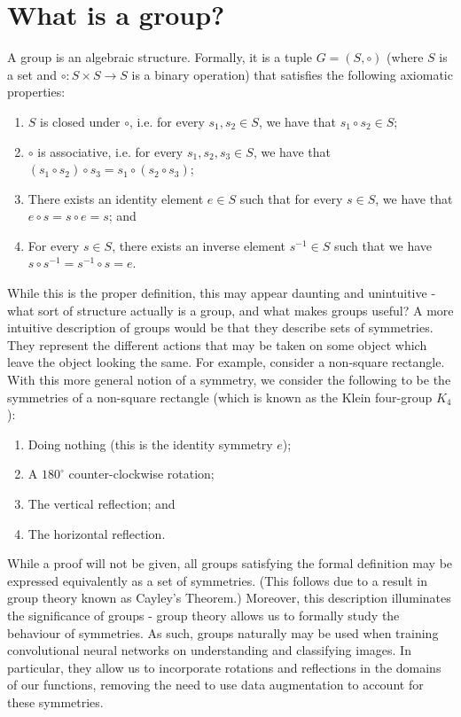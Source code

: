 \documentclass{article}
\begin{document}
\section{What is a group?}
    A group is an algebraic structure. Formally, it is a tuple \(G = (S, \circ)\) (where \(S\) is a set and \(\circ: S \times S \to S\) is a binary operation) that satisfies the following axiomatic properties:
    \begin{enumerate}
        \item \(S\) is closed under \(\circ\), i.e. for every \(s_1, s_2 \in S\), we have that \(s_1 \circ s_2 \in S\);
        \item \(\circ\) is associative, i.e. for every \(s_1, s_2, s_3 \in S\), we have that \\
        \((s_1 \circ s_2) \circ s_3 = s_1 \circ (s_2 \circ s_3)\);
        \item There exists an identity element \(e \in S\) such that for every \(s \in S\), we have that \(e \circ s = s \circ e = s\); and
        \item For every \(s \in S\), there exists an inverse element \(s^{-1} \in S\) such that we have \(s \circ s^{-1} = s^{-1} \circ s = e\).
    \end{enumerate}
    While this is the proper definition, this may appear daunting and unintuitive - what sort of structure actually is a group, and what makes groups useful? A more intuitive description of groups would be that they describe sets of symmetries. They represent the different actions that may be taken on some object which leave the object looking the same. For example, consider a non-square rectangle. With this more general notion of a symmetry, we consider the following to be the symmetries of a non-square rectangle (which is known as the Klein four-group \(K_4\)):
    \begin{enumerate}
        \item Doing nothing (this is the identity symmetry \(e\));
        \item A \(180^{\circ}\) counter-clockwise rotation;
        \item The vertical reflection; and
        \item The horizontal reflection.
    \end{enumerate}
    While a proof will not be given, all groups satisfying the formal definition may be expressed equivalently as a set of symmetries. (This follows due to a result in group theory known as Cayley's Theorem.) Moreover, this description illuminates the significance of groups - group theory allows us to formally study the behaviour of symmetries. As such, groups naturally may be used when training convolutional neural networks on understanding and classifying images. In particular, they allow us to incorporate rotations and reflections in the domains of our functions, removing the need to use data augmentation to account for these symmetries.
\end{document}
